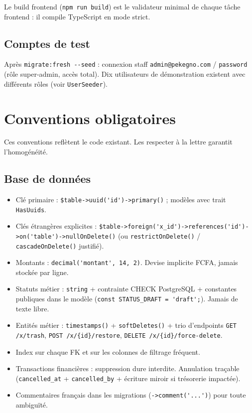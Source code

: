\documentclass[11pt,a4paper]{article}
\begin{document}
Le build frontend (\verb|npm run build|) est le validateur minimal de chaque tâche frontend : il compile TypeScript en mode strict.

\subsection{Comptes de test}

Après \verb|migrate:fresh --seed| : connexion staff \verb|admin@pekegno.com| / \verb|password| (rôle super-admin, accès total). Dix utilisateurs de démonstration existent avec différents rôles (voir \verb|UserSeeder|).

\section{Conventions obligatoires}

Ces conventions reflètent le code existant. Les respecter à la lettre garantit l'homogénéité.

\subsection{Base de données}

\begin{itemize}[nosep]
  \item Clé primaire : \verb|$table->uuid('id')->primary()| ; modèles avec trait \verb|HasUuids|.
  \item Clés étrangères explicites : \verb|$table->foreign('x_id')->references('id')->on('table')->nullOnDelete()| (ou \verb|restrictOnDelete()| / \verb|cascadeOnDelete()| justifié).
  \item Montants : \verb|decimal('montant', 14, 2)|. Devise implicite FCFA, jamais stockée par ligne.
  \item Statuts métier : \verb|string| + contrainte CHECK PostgreSQL + constantes publiques dans le modèle (\verb|const STATUS_DRAFT = 'draft';|). Jamais de texte libre.
  \item Entités métier : \verb|timestamps()| + \verb|softDeletes()| + trio d'endpoints \verb|GET /x/trash|, \verb|POST /x/{id}/restore|, \verb|DELETE /x/{id}/force-delete|.
  \item Index sur chaque FK et sur les colonnes de filtrage fréquent.
  \item Transactions financières : suppression dure interdite. Annulation traçable (\verb|cancelled_at| + \verb|cancelled_by| + écriture miroir si trésorerie impactée).
  \item Commentaires français dans les migrations (\verb|->comment('...')|) pour toute ambiguïté.
\end{itemize}
\end{document}
